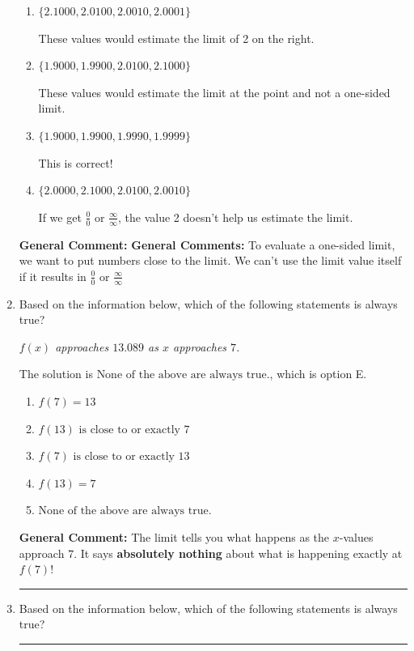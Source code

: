 \documentclass{extbook}[14pt]
\newcommand{\litem}[1]{\item #1

\rule{\textwidth}{0.4pt}}
\begin{document}
\begin{enumerate}
{\begin{enumerate}[label=\Alph*.]
If we get $\frac{0}{0}$ or $\frac{\infty}{\infty}$, the value 2 doesn't help us estimate the limit.
\item \( \{ 2.1000, 2.0100, 2.0010, 2.0001 \} \)

These values would estimate the limit of 2 on the right.
\item \( \{ 1.9000, 1.9900, 2.0100, 2.1000 \} \)

These values would estimate the limit at the point and not a one-sided limit.
\item \( \{ 1.9000, 1.9900, 1.9990, 1.9999 \} \)

This is correct!
\item \( \{ 2.0000, 2.1000, 2.0100, 2.0010 \} \)

If we get $\frac{0}{0}$ or $\frac{\infty}{\infty}$, the value 2 doesn't help us estimate the limit.
\end{enumerate}

\textbf{General Comment:} \textbf{General Comments:} To evaluate a one-sided limit, we want to put numbers close to the limit. We can't use the limit value itself if it results in $\frac{0}{0}$ or $\frac{\infty}{\infty}$
}
\litem{
Based on the information below, which of the following statements is always true?

\begin{center}
    \textit{ $f(x)$ approaches $13.089$ as $x$ approaches $7$. }
\end{center}
The solution is \( \text{None of the above are always true.} \), which is option E.\begin{enumerate}[label=\Alph*.]
\item \( f(7) = 13 \)


\item \( f(13) \text{ is close to or exactly } 7 \)


\item \( f(7) \text{ is close to or exactly } 13 \)


\item \( f(13) = 7 \)


\item \( \text{None of the above are always true.} \)


\end{enumerate}

\textbf{General Comment:} The limit tells you what happens as the $x$-values approach $7$. It says \textbf{absolutely nothing} about what is happening exactly at $f(7)$!
}
\litem{
Based on the information below, which of the following statements is always true?

}
\end{enumerate}
\end{document}
